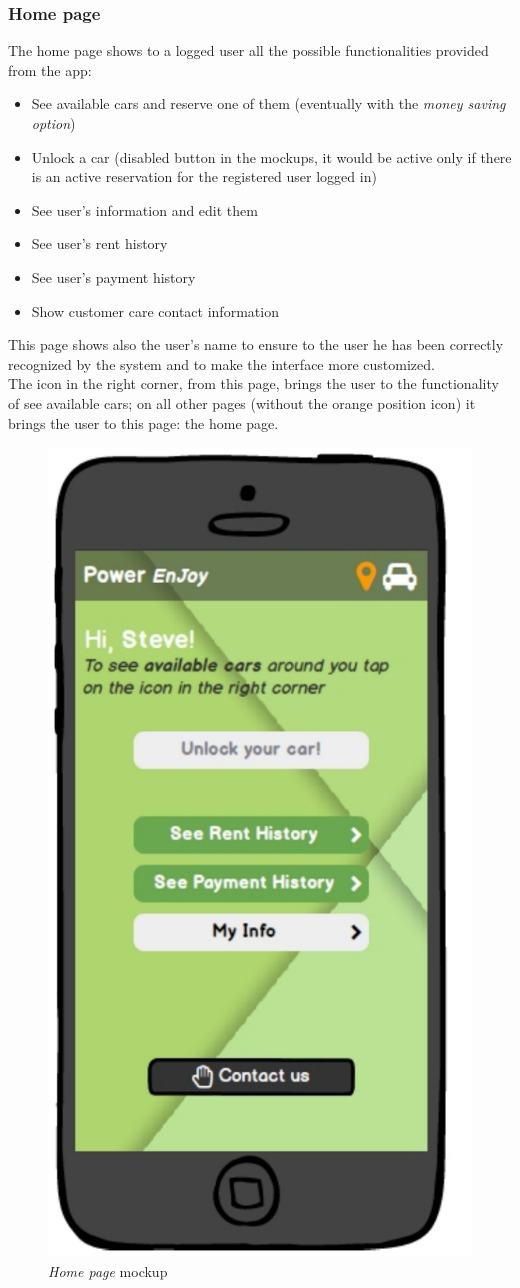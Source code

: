 \subsubsection{Home page}
The home page shows to a logged user all the possible functionalities provided from the app:
\begin{itemize}
	\item See available cars and reserve one of them (eventually with the \emph{money saving option})
	\item Unlock a car (disabled button in the mockups, it would be active only if there is an active reservation for the registered user logged in)
	\item See user's information and edit them
	\item See user's rent history
	\item See user's payment history
	\item Show customer care contact information
\end{itemize}

This page shows also the user's name to ensure to the user he has been correctly recognized by the system and to make the interface more customized. \\

The icon in the right corner, from this page, brings the user to the functionality of see available cars; on all other pages (without the orange position icon) it brings the user to this page: the home page.

	\begin{figure}[h]
			\centering
			\includegraphics[width=0.4\linewidth]{mockups/homePage}
			\caption{
				\label{fig:homePage} 
				\emph{Home page} mockup 
			}
		\end{figure}
		
